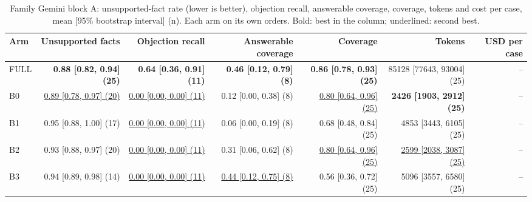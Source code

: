 \begin{table}[htbp]
\centering\footnotesize
\begin{adjustbox}{max width=\textwidth}
\begin{tabular}{@{}lrrrrrr@{}}
\toprule
Arm & Unsupported facts & Objection recall & Answerable coverage & Coverage & Tokens & USD per case \\
\midrule
FULL & \textbf{0.88 [0.82, 0.94] (25)} & \textbf{0.64 [0.36, 0.91] (11)} & \textbf{0.46 [0.12, 0.79] (8)} & \textbf{0.86 [0.78, 0.93] (25)} & 85128 [77643, 93004] (25) & -- \\
B0 & \underline{0.89 [0.78, 0.97] (20)} & \underline{0.00 [0.00, 0.00] (11)} & 0.12 [0.00, 0.38] (8) & \underline{0.80 [0.64, 0.96] (25)} & \textbf{2426 [1903, 2912] (25)} & -- \\
B1 & 0.95 [0.88, 1.00] (17) & \underline{0.00 [0.00, 0.00] (11)} & 0.06 [0.00, 0.19] (8) & 0.68 [0.48, 0.84] (25) & 4853 [3443, 6105] (25) & -- \\
B2 & 0.93 [0.88, 0.97] (20) & \underline{0.00 [0.00, 0.00] (11)} & 0.31 [0.06, 0.62] (8) & \underline{0.80 [0.64, 0.96] (25)} & \underline{2599 [2038, 3087] (25)} & -- \\
B3 & 0.94 [0.89, 0.98] (14) & \underline{0.00 [0.00, 0.00] (11)} & \underline{0.44 [0.12, 0.75] (8)} & 0.56 [0.36, 0.72] (25) & 5096 [3557, 6580] (25) & -- \\
\bottomrule
\end{tabular}
\end{adjustbox}
\caption{Family Gemini block A: unsupported-fact rate (lower is better), objection recall, answerable coverage, coverage, tokens and cost per case, mean [95\% bootstrap interval] (n). Each arm on its own orders. Bold: best in the column; underlined: second best.}
\label{tab:table1b_gemini}
\end{table}